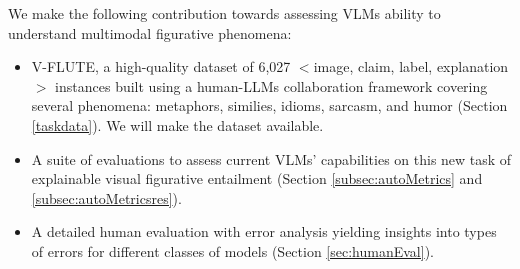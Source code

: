 We make the following contribution towards assessing VLMs ability to understand multimodal figurative phenomena:
\begin{itemize}[leftmargin=*]
    \itemsep0em
    \item V-FLUTE, a high-quality dataset of 6,027 $<$image, claim, label, explanation$>$ instances 
    built using a human-LLMs collaboration framework covering several phenomena: metaphors, similies, idioms, sarcasm, and humor (Section \ref{taskdata}). We will make the dataset available.
    \item A suite of evaluations to assess current VLMs' capabilities on this new task of explainable visual figurative entailment (Section \ref{subsec:autoMetrics} and \ref{subsec:autoMetricsres}).
    \item A detailed human evaluation with error analysis yielding insights into types of errors for different classes of models (Section \ref{sec:humanEval}).
\end{itemize}

